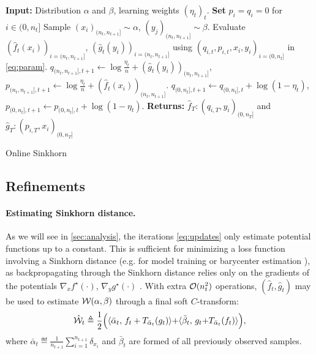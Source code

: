 \begin{algorithm}[t]
    \begin{algorithmic}
    \State \textbf{Input:} Distribution $\alpha$ and $\beta$, learning weights ${(\eta_t)}_t$. 
    \textbf{Set} $p_i = q_i = 0$ for $i \in (0, n_t]$
        \State Sample $(x_i)_{(n_t, n_{t+1}]} \sim \alpha$, $(y_j)_{(n_t, n_{t+1}]} \sim \beta$.
            \State Evaluate $(\hat f_t(x_i))_{i=(n_t, n_{t+1}]}$,
             $(\hat g_t(y_i))_{i=(n_t, n_{t+1}]}$ using $(q_{i,t}, p_{i,t}, x_i, y_i)_{i=(0,n_{t}]}$ in \eqref{eq:param}.
             \State $q_{(n_t, n_{t+1}],t+1} {\gets} \log \frac{\eta_t}{n}
             + (\hat g_t(y_i))_{(n_t, n_{t+1}]}$,
             \qquad $p_{(n_t, n_{t+1}],t+1} {\gets} \log \frac{\eta_t}{n} 
             + (\hat f_t(x_i))_{(n_t, n_{t+1}]}$.
            \State $q_{(0, n_t],t+1} \gets q_{(0, n_t],t} + \log(1 - \eta_t)$, \qquad
            $p_{(0, n_t],t+1} \gets p_{(0, n_t],t} + \log(1 - \eta_t)$.
    \EndFor
    \State \textbf{Returns:} $\hat f_T : (q_{i,T}, y_i)_{(0, n_T]}$ and
    $\hat g_T : (p_{i,T}, x_i)_{(0, n_T]}$
    \end{algorithmic}
    \caption{Online Sinkhorn}\label{alg:online_sinkhorn}
\end{algorithm}


\subsection{Refinements}
\paragraph{Estimating Sinkhorn distance.} 

As we will see in \autoref{sec:analysis}, the iterations \eqref{eq:updates} only estimate potential functions up to a
constant. This is sufficient for minimizing a loss function involving a Sinkhorn
distance (e.g. for model training or barycenter estimation \citep{staib2017parallel}), as backpropagating through the Sinkhorn distance
relies only on the gradients of the potentials $\nabla_x f^\star(\cdot)$,
$\nabla_y g^\star(\cdot)$ \citep[e.g.][]{cuturi2018semidual}. With extra
$\Oo(n_t^2)$ operations, $(\hat f_t, \hat g_t)$ may be used to
estimate $\Ww(\alpha,\beta)$ through a final soft $C$-transform:
\begin{equation}\label{eq-dist-est}
    \hat \Ww_t \triangleq \frac{1}{2}\Big(\dotp{\bar \alpha_t}{f_t + \Ctrans{g_t}{\bar \alpha_t}}
     {+} \dotp{\bar \beta_t}{g_t {+} \Ctrans{f_t}{\bar \alpha_t}}\Big),
\end{equation}
where $\bar \alpha_t \eqdef \frac{1}{n_{t+1}}\sum_{i=1}^{n_{t+1}} \delta_{x_i}$
and $\bar \beta_t$ are formed of all previously observed samples.

